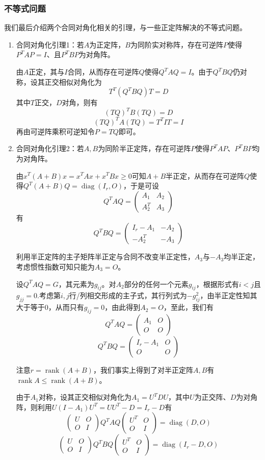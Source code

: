 \documentclass[a4paper,UTF8,fontset=windows]{ctexart}
\DeclareMathOperator{\diag}{diag}
\DeclareMathOperator{\rank}{rank}
\newcommand*{\note}{\noindent *}
\begin{document}
\subsubsection{不等式问题}
我们最后介绍两个合同对角化相关的引理，与一些正定阵解决的不等式问题。
\begin{enumerate}
    \item 合同对角化引理1：若$A$为正定阵，$B$为同阶实对称阵，存在可逆阵$P$使得$P^TAP=I$、且$P^TBP$为对角阵。
    
    由$A$正定，其与$I$合同，从而存在可逆阵$Q$使得$Q^TAQ=I$。由于$Q^TBQ$仍对称，设其正交相似对角化为
    $$T^T(Q^TBQ)T=D$$
    其中$T$正交，$D$对角，则有
    $$(TQ)^TB(TQ)=D$$
    $$(TQ)^TA(TQ)=T^TIT=I$$
    再由可逆阵乘积可逆知令$P=TQ$即可。

    \item 合同对角化引理2：若$A,B$为同阶半正定阵，存在可逆阵$P$使得$P^TAP$、$P^TBP$均为对角阵。
    
    由$x^T(A+B)x=x^TAx+x^TBx\ge0$可知$A+B$半正定，从而存在可逆阵$Q$使得$Q^T(A+B)Q=\diag(I_r,O)$，于是可设
    $$Q^TAQ=\begin{pmatrix}A_1&A_2\\A_2^T&A_3\end{pmatrix}$$
    有
    $$Q^TBQ=\begin{pmatrix}I_r-A_1&-A_2\\-A_2^T&-A_3\end{pmatrix}$$

    利用半正定阵的主子矩阵半正定与合同不改变半正定性，$A_3$与$-A_3$均半正定，考虑惯性指数可知只能为$A_3=O$。

    设$Q^TAQ=G$，其元素为$g_{ij}$。对$A_2$部分的任何一个元素$g_{ij}$，根据形式有$i<j$且$g_{jj}=0$.考虑第$i,j$行/列相交形成的主子式，其行列式为$-g_{ij}^2$，由半正定性知其大于等于0，从而只有$g_{ij}=0$，由此得到$A_2=O$，至此，我们有
    $$Q^TAQ=\begin{pmatrix}A_1&O\\O&O\end{pmatrix}$$
    $$Q^TBQ=\begin{pmatrix}I_r-A_1&O\\O&O\end{pmatrix}$$

    \note 注意$r=\rank(A+B)$，我们事实上得到了对半正定阵$A,B$有$\rank A\le\rank(A+B)$。

    由于$A_1$对称，设其正交相似对角化为$A_1=U^TDU$，其中$U$为正交阵、$D$为对角阵，则利用$U(I-A_1)U^T=UU^T-D=I_r-D$有
    $$\begin{pmatrix}U&O\\O&I\end{pmatrix}Q^TAQ\begin{pmatrix}U^T&O\\O&I\end{pmatrix}=\diag(D,O)$$
    $$\begin{pmatrix}U&O\\O&I\end{pmatrix}Q^TBQ\begin{pmatrix}U^T&O\\O&I\end{pmatrix}=\diag(I_r-D,O)$$


\end{enumerate}
\end{document}
